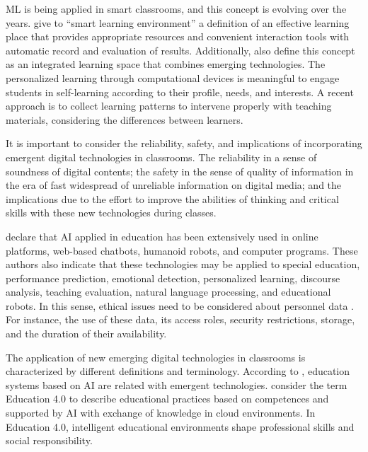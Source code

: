 \documentclass[english]{textolivre}
\begin{document}
ML is being applied in smart classrooms, and this concept is evolving
over the years. \textcite{Yang2021} give to ``smart learning
environment'' a definition of an effective learning place that provides
appropriate resources and convenient interaction tools with automatic
record and evaluation of results. Additionally, \textcite{Dimitriadou2022} also define this concept as an integrated learning space that
combines emerging technologies. The personalized learning through
computational devices is meaningful to engage students in self-learning
according to their profile, needs, and interests. A recent approach
\cite{Luan2021} is to collect learning patterns to intervene properly
with teaching materials, considering the differences between learners.

It is important to consider the reliability, safety,
and implications of incorporating emergent digital technologies in
classrooms. The reliability in a sense of soundness of digital contents;
the safety in the sense of quality of information in the era of fast
widespread of unreliable information on digital media; and the
implications due to the effort to improve the abilities of thinking and
critical skills with these new technologies during classes.

\textcite{Chen2021} declare that AI applied in education has been
extensively used in online platforms, web-based chatbots, humanoid
robots, and computer programs. These authors also indicate that these
technologies may be applied to special education, performance
prediction, emotional detection, personalized learning, discourse
analysis, teaching evaluation, natural language processing, and
educational robots. In this sense, ethical issues need to be considered
about personnel data \cite{Pelletier2021}. For instance, the use of
these data, its access roles, security restrictions, storage, and the
duration of their availability.

The application of new emerging digital technologies in classrooms is
characterized by different definitions and terminology. According to
\textcite{Wang2023}, education systems based on AI are related with
emergent technologies. \textcite{ChamorroAtalaya2023} consider the term
Education 4.0 to describe educational practices based on competences and
supported by AI with exchange of knowledge in cloud environments. In
Education 4.0, intelligent educational environments shape professional
skills and social responsibility.
\end{document}
